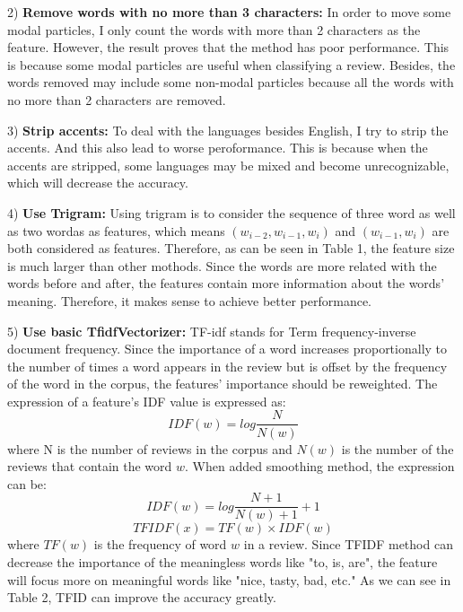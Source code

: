 \documentclass[letterpaper, 10 pt, conference]{ieeeconf}  %
\begin{document}
2) \textbf{Remove words with no more than 3 characters: }In order to move some modal particles, I only count the words with more than 2 characters as the feature. However, the result proves that the method has poor performance. This is because some modal particles are useful when classifying a review. Besides, the words removed may include some non-modal particles because all the words with no more than 2 characters are removed.

3) \textbf{Strip accents: }To deal with the languages besides English, I try to strip the accents. And this also lead to worse peroformance. This is because when the accents are stripped, some languages may be mixed and become unrecognizable, which will decrease the accuracy.

4) \textbf{Use Trigram: }Using trigram is to consider the sequence of three word as well as two wordas as features, which means $(w_{i-2},w_{i-1},w_i)$ and $(w_{i-1},w_i)$ are both considered as features. Therefore, as can be seen in Table 1, the feature size is much larger than other mothods. Since the words are more related with the words before and after, the features contain more information about the words' meaning. Therefore, it makes sense to achieve better performance.

5) \textbf{Use basic TfidfVectorizer: }TF-idf stands for Term frequency-inverse document frequency. Since the importance of a word increases proportionally to the number of times a word appears in the review but is offset by the frequency of the word in the corpus, the features' importance should be reweighted. The expression of a feature's IDF value is expressed as:
\begin{equation}
IDF(w)=log\frac{N}{N(w)}
\end{equation}
where N is the number of reviews in the corpus and $N(w)$ is the number of the reviews that contain the word $w$. When added smoothing method, the expression can be:
\begin{equation}
IDF(w)=log\frac{N+1}{N(w)+1}+1
\end{equation}
\begin{equation}
TFIDF(x)=TF(w)\times IDF(w)
\end{equation}
where $TF(w)$ is the frequency of word $w$ in a review. Since TFIDF method can decrease the importance of the meaningless words like "to, is, are", the feature will focus more on meaningful words like "nice, tasty, bad, etc." As we can see in Table 2, TFID can improve the accuracy greatly.
\end{document}
